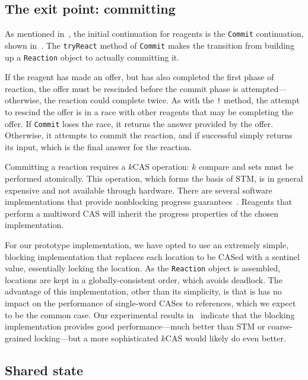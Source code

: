 \documentclass[preprint,nocopyrightspace]{sigplanconf}
\begin{document}
\subsection{The exit point: committing}
\label{sec:impl-commit}

As mentioned in~, the initial continuation for reagents is the
\lstinline{Commit} continuation, shown in~.  The
\lstinline{tryReact} method of \lstinline{Commit} makes the transition from
building up a \lstinline{Reaction} object to actually committing it.

If the reagent has made an offer, but has also completed the first phase of
reaction, the offer must be rescinded before the commit phase is
attempted---otherwise, the reaction could complete twice.  As with the
\lstinline{!} method, the attempt to rescind the offer is in a race with other
reagents that may be completing the offer.  If \lstinline{Commit} loses the
race, it returns the answer provided by the offer.  Otherwise, it attempts to
commit the reaction, and if successful simply returns its input, which is the
final answer for the reaction.

Committing a reaction requires a $k$CAS operation: $k$ compare and sets must be
performed atomically.  This operation, which forms the basis of STM, is in
general expensive and not available through hardware.  There are several
software implementations that provide nonblocking progress
guarantees~\cite{Fraser2007,Luchangco2003,Attiya2008}.  Reagents that perform a
multiword CAS will inherit the progress properties of the chosen implementation.

For our prototype implementation, we have opted to use an extremely simple,
blocking implementation that replaces each location to be CASed with a sentinel
value, essentially locking the location.  As the \lstinline{Reaction} object is
assembled, locations are kept in a globally-consistent order, which avoids
deadlock.  The advantage of this implementation, other than its simplicity, is
that is has no impact on the performance of single-word CASes to references,
which we expect to be the common case.  Our experimental results
in~ indicate that the blocking implementation provides good
performance---much better than STM or coarse-grained locking---but a more
sophisticated $k$CAS would likely do even better.

\subsection{Shared state}
\label{sec:impl-state}
\end{document}

